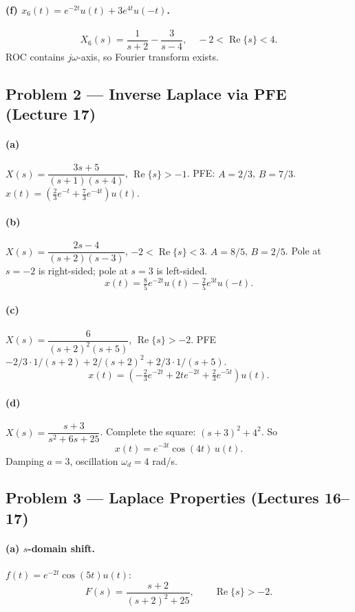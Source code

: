 \documentclass[11pt]{article}
\newcommand{\Real}{\operatorname{Re}}
\begin{document}
\paragraph{(f) $x_6(t) = e^{-2t}u(t) + 3e^{4t}u(-t)$.}
\[
X_6(s) = \frac{1}{s+2} - \frac{3}{s-4}, \quad -2 < \Real\{s\} < 4.
\]
ROC contains $j\omega$-axis, so Fourier transform exists.

\subsection{Problem 2 --- Inverse Laplace via PFE (Lecture 17)}

\paragraph{(a)} $X(s) = \dfrac{3s+5}{(s+1)(s+4)}$, $\Real\{s\}>-1$. PFE: $A = 2/3$, $B = 7/3$. $x(t) = (\tfrac{2}{3}e^{-t} + \tfrac{7}{3}e^{-4t})u(t)$.

\paragraph{(b)} $X(s) = \dfrac{2s-4}{(s+2)(s-3)}$, $-2 < \Real\{s\} < 3$. $A = 8/5$, $B = 2/5$. Pole at $s=-2$ is right-sided; pole at $s=3$ is left-sided.
\[
x(t) = \tfrac{8}{5}e^{-2t}u(t) - \tfrac{2}{5}e^{3t}u(-t).
\]

\paragraph{(c)} $X(s) = \dfrac{6}{(s+2)^2(s+5)}$, $\Real\{s\}>-2$. PFE $-2/3 \cdot 1/(s+2) + 2/(s+2)^2 + 2/3 \cdot 1/(s+5)$.
\[
x(t) = \left(-\tfrac{2}{3}e^{-2t}+2te^{-2t}+\tfrac{2}{3}e^{-5t}\right)u(t).
\]

\paragraph{(d)} $X(s) = \dfrac{s+3}{s^2+6s+25}$. Complete the square: $(s+3)^2 + 4^2$. So
\[
x(t) = e^{-3t}\cos(4t)\,u(t).
\]
Damping $a=3$, oscillation $\omega_d = 4$ rad/s.

\subsection{Problem 3 --- Laplace Properties (Lectures 16--17)}

\paragraph{(a) $s$-domain shift.} $f(t) = e^{-2t}\cos(5t)u(t)$:
\[
F(s) = \frac{s+2}{(s+2)^2 + 25}, \qquad \Real\{s\}>-2.
\]
\end{document}
